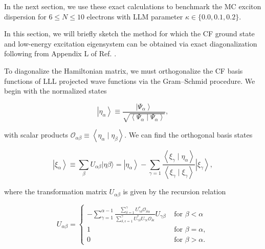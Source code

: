     In the next section, we use these exact calculations to benchmark the MC exciton dispersion for $6\leq N\leq10$ electrons with LLM parameter $\kappa\in\{0.0,0.1,0.2\}$.

\iffalse    
    In this section, we will briefly sketch the method for which the CF ground state and low-energy excitation eigensystem can be obtained via exact diagonalization following from Appendix L of Ref. \cite{jain}.
    
    To diagonalize the Hamiltonian matrix, we must orthogonalize the CF basis functions of LLL projected wave functions via the Gram–Schmid procedure. We begin with the normalized states
    
    \begin{equation}\label{normStat}
    \left|\eta_{\alpha}\right\rangle \equiv \frac{\left|\Psi_{\alpha}\right\rangle}{\sqrt{\left\langle\Psi_{\alpha} \mid \Psi_{\alpha}\right\rangle}},
    \end{equation}
    
    with scalar products $\mathcal{O}_{\alpha \beta} \equiv\left\langle\eta_{\alpha} \mid \eta_{\beta}\right\rangle$. We can find the orthogonal basis states 
    
    \begin{equation}\label{orthBasStat}
    \left|\xi_{\alpha}\right\rangle\equiv \sum_{\beta} U_{\alpha \beta}|\eta \beta\rangle=\left|\eta_{\alpha}\right\rangle-\sum_{\gamma=1} \frac{\left\langle\xi_{\gamma} \mid \eta_{\alpha}\right\rangle}{\left\langle\xi_{\gamma} \mid \xi_{\gamma}\right\rangle}\left|\xi_{\gamma}\right\rangle,
    \end{equation}
    
    where the transformation matrix $U_{\alpha \beta}$ is given by the recursion relation
    
    \begin{equation}
    U_{\alpha \beta}=\left\{\begin{array}{cc}
    -\sum_{\gamma=1}^{\alpha-1} \frac{\sum_{\delta=1}^{\gamma} U_{\gamma \delta}^{*} \mathcal{O}_{\delta \alpha}}{\sum_{\delta, \epsilon=1}^{\gamma} U_{\gamma \delta}^{*} U_{\gamma \epsilon} \mathcal{O}_{\delta \epsilon}} U_{\gamma \beta} & \text { for } \beta<\alpha \\
    1 & \text { for } \beta=\alpha, \\
    0 & \text { for } \beta>\alpha.
    \end{array}\right.
    \end{equation}
    
